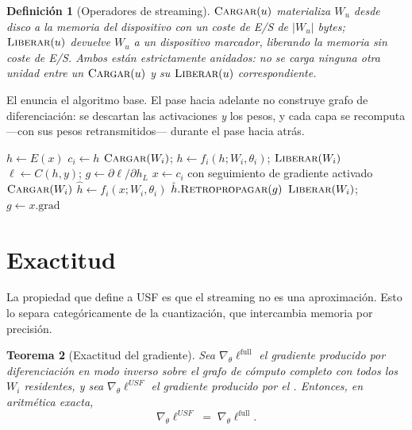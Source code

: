 \documentclass[journal]{IEEEtran}
\newtheorem{theorem}{Teorema}
\newtheorem{definition}[theorem]{Definición}
\newcommand{\usf}{USF}
\newcommand{\Wu}{\lvert W_u \rvert}
\begin{document}
\begin{definition}[Operadores de streaming]
\label{def:ops}
$\textsc{Cargar}(u)$ materializa $W_u$ desde disco a la memoria del dispositivo con un coste de E/S
de $\Wu$ bytes; $\textsc{Liberar}(u)$ devuelve $W_u$ a un dispositivo marcador, liberando la
memoria sin coste de E/S. Ambos están estrictamente anidados: no se carga ninguna otra unidad entre
un $\textsc{Cargar}(u)$ y su $\textsc{Liberar}(u)$ correspondiente.
\end{definition}

El  enuncia el algoritmo base. El pase hacia adelante no construye grafo de
diferenciación: se descartan las activaciones \emph{y} los pesos, y cada capa se recomputa ---con
sus pesos retransmitidos--- durante el pase hacia atrás.

\begin{algorithm}[t]
\caption{\usf{} (batch-major, granularidad de capa)}
\label{alg:usf}
\begin{algorithmic}[1]
\State $h \gets E(x)$
 
    \State $c_i \gets h$ 
    \State $\textsc{Cargar}(W_i)$; \; $h \gets f_i(h; W_i, \theta_i)$; \; $\textsc{Liberar}(W_i)$
\EndFor
\State $\ell \gets C(h,y)$; \; $g \gets \partial\ell/\partial h_L$
 
    \State $x \gets c_i$ con seguimiento de gradiente activado
    \State $\textsc{Cargar}(W_i)$
    \State $\hat h \gets f_i(x; W_i, \theta_i)$ 
    \State $\hat h.\textsc{Retropropagar}(g)$ 
    \State $\textsc{Liberar}(W_i)$; \; $g \gets x.\mathrm{grad}$
\EndFor
\end{algorithmic}
\end{algorithm}

\section{Exactitud}
\label{sec:exact}

La propiedad que define a \usf{} es que el streaming no es una aproximación. Esto lo separa
categóricamente de la cuantización, que intercambia memoria por precisión.

\begin{theorem}[Exactitud del gradiente]
\label{thm:exact}
Sea $\nabla_\theta \ell^{\mathrm{full}}$ el gradiente producido por diferenciación en modo inverso
sobre el grafo de cómputo completo con todos los $W_i$ residentes, y sea
$\nabla_\theta \ell^{\usf}$ el gradiente producido por el . Entonces, en aritmética
exacta,
\begin{equation}
\nabla_\theta \ell^{\usf} \;=\; \nabla_\theta \ell^{\mathrm{full}} .
\end{equation}
\end{theorem}
\end{document}
